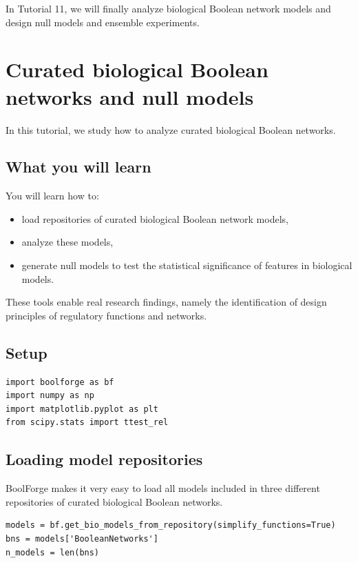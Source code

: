\documentclass[
]{article}
\providecommand{\tightlist}{%
  \setlength{\itemsep}{0pt}\setlength{\parskip}{0pt}}
\begin{document}
In Tutorial 11, we will finally analyze biological Boolean network
models and design null models and ensemble experiments.

\section{Curated biological Boolean networks and null
models}\label{curated-biological-boolean-networks-and-null-models}

In this tutorial, we study how to analyze curated biological Boolean
networks.

\subsection{What you will learn}\label{what-you-will-learn-10}

You will learn how to:

\begin{itemize}
\tightlist
\item
  load repositories of curated biological Boolean network models,
\item
  analyze these models,
\item
  generate null models to test the statistical significance of features
  in biological models.
\end{itemize}

These tools enable real research findings, namely the identification of
design principles of regulatory functions and networks.

\subsection{Setup}\label{setup-10}

\begin{lstlisting}
import boolforge as bf
import numpy as np
import matplotlib.pyplot as plt
from scipy.stats import ttest_rel
\end{lstlisting}

\subsection{Loading model
repositories}\label{loading-model-repositories}

BoolForge makes it very easy to load all models included in three
different repositories of curated biological Boolean networks.

\begin{lstlisting}
models = bf.get_bio_models_from_repository(simplify_functions=True)
bns = models['BooleanNetworks']
n_models = len(bns)
\end{lstlisting}
\end{document}
